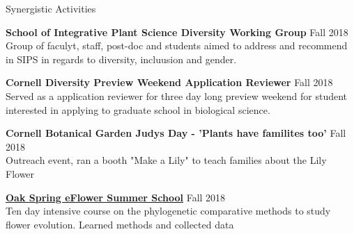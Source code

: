 \documentclass{resume} %
\begin{document}
\begin{rSection}{Synergistic Activities}

\textbf{School of Integrative Plant Science Diversity Working Group} \hfill Fall 2018 \\
Group of faculyt, staff, post-doc and students aimed to address and recommend in SIPS in regards to diversity, incluusion and gender. 

\textbf{Cornell Diversity Preview Weekend Application Reviewer } \hfill Fall 2018 \\
Served as a application reviewer for three day long preview weekend for student interested in applying to graduate school in biological science.  

\textbf{Cornell Botanical Garden Judys Day - 'Plants have familites too'} \hfill Fall 2018 \\
Outreach event, ran a booth "Make a Lily" to teach families about the Lily Flower

\href{http://eflower.myspecies.info/oakspringsummerschool}{\textbf{Oak Spring eFlower Summer School}} \hfill Fall 2018 \\
Ten day intensive course on the phylogenetic comparative methods to study flower evolution. Learned methods and collected data 

\end{rSection}
\end{document}
